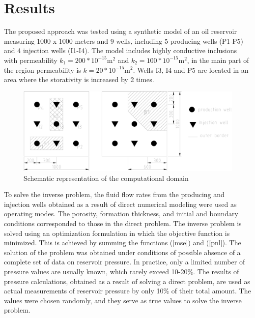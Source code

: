 \documentclass[
11pt,%
tightenlines,%
twoside,%
onecolumn,%
nofloats,%
nobibnotes,%
nofootinbib,%
superscriptaddress,%
noshowpacs,%
centertags]%
{revtex4}
\begin{document}
\section{Results}

The proposed approach was tested using a synthetic model of an oil reservoir measuring 1000 x 1000 meters and 9 wells, including 5 producing wells (P1-P5) and 4 injection wells (I1-I4). The model includes highly conductive inclusions with permeability $k_1 = 200*10^{-15} \text{m}^2$ and $k_2 = 100*10^{-15} \text{m}^2$, in the main part of the region permeability is $k = 20*10^{-15} \text{m}^2$. Wells I3, I4 and P5 are located in an area where the storativity is increased by 2 times.

\begin{figure}
	\centering
	\includegraphics[width=0.7\linewidth]{images/fig2.eps}
	\caption{Schematic representation of the computational domain}
	\label{fig:schime}
\end{figure}

To solve the inverse problem, the fluid flow rates from the producing and injection wells obtained as a result of direct numerical modeling were used as operating modes. The porosity, formation thickness, and initial and boundary conditions corresponded to those in the direct problem.
The inverse problem is solved using an optimization formulation in which the objective function is minimized. This is achieved by summing the functions (\ref{mse}) and (\ref{pnl}).
The solution of the problem was obtained under conditions of possible absence of a complete set of data on reservoir pressure.
In practice, only a limited number of pressure values are usually known, which rarely exceed 10-20\%. The results of pressure calculations, obtained as a result of solving a direct problem, are used as actual measurements of reservoir pressure by only 10\% of their total amount. The values were chosen randomly, and they serve as true values to solve the inverse problem.
\end{document}
